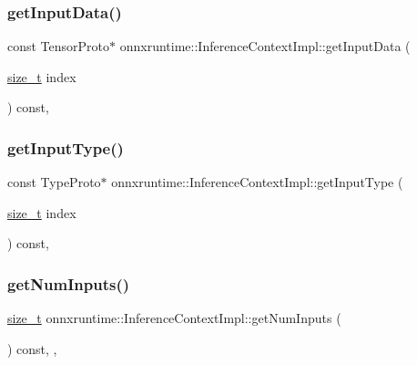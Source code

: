 \subsubsection{\texorpdfstring{get\+Input\+Data()}{getInputData()}}
{\footnotesize\ttfamily const Tensor\+Proto$\ast$ onnxruntime\+::\+Inference\+Context\+Impl\+::get\+Input\+Data (\begin{DoxyParamCaption}\item[{\mbox{\hyperlink{mlasi_8h_a503efbc1c6e50825320ad909366b78ab}{size\+\_\+t}}}]{index }\end{DoxyParamCaption}) const\hspace{0.3cm}{\ttfamily [inline]}, {\ttfamily [override]}}

\mbox{\label{classonnxruntime_1_1InferenceContextImpl_af2af6aa91a8dbdb477866da91856cbca}} 
\subsubsection{\texorpdfstring{get\+Input\+Type()}{getInputType()}}
{\footnotesize\ttfamily const Type\+Proto$\ast$ onnxruntime\+::\+Inference\+Context\+Impl\+::get\+Input\+Type (\begin{DoxyParamCaption}\item[{\mbox{\hyperlink{mlasi_8h_a503efbc1c6e50825320ad909366b78ab}{size\+\_\+t}}}]{index }\end{DoxyParamCaption}) const\hspace{0.3cm}{\ttfamily [inline]}, {\ttfamily [override]}}

\mbox{\label{classonnxruntime_1_1InferenceContextImpl_a746e9bef7556f5396035691aee180fe1}} 
\subsubsection{\texorpdfstring{get\+Num\+Inputs()}{getNumInputs()}}
{\footnotesize\ttfamily \mbox{\hyperlink{mlasi_8h_a503efbc1c6e50825320ad909366b78ab}{size\+\_\+t}} onnxruntime\+::\+Inference\+Context\+Impl\+::get\+Num\+Inputs (\begin{DoxyParamCaption}{ }\end{DoxyParamCaption}) const\hspace{0.3cm}{\ttfamily [inline]}, {\ttfamily [override]}, {\ttfamily [noexcept]}}

